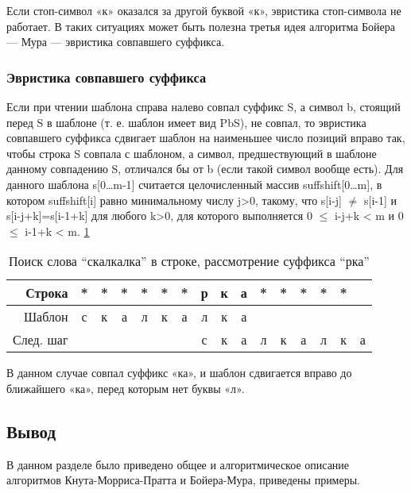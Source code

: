 \documentclass[../main.tex]{subfiles}
\begin{document}
	Если стоп-символ «к» оказался за другой буквой «к», эвристика стоп-символа не работает. 
	В таких ситуациях может быть полезна третья идея алгоритма Бойера — Мура — эвристика совпавшего суффикса.

\subsubsection{Эвристика совпавшего суффикса}
	
	Если при чтении шаблона справа налево совпал суффикс S, а символ b, стоящий перед S в шаблоне (т. е. шаблон имеет вид PbS), не совпал, то эвристика совпавшего суффикса сдвигает шаблон на наименьшее число позиций вправо так, чтобы строка S совпала с шаблоном, а символ, предшествующий в шаблоне данному совпадению S, отличался бы от b (если такой символ вообще есть). 
	Для данного шаблона s[0…m-1] считается целочисленный массив suffshift[0…m], в котором suffshift[i] равно минимальному числу j>0, такому, что s[i-j] $\neq$ s[i-1] и s[i-j+k]=s[i-1+k] для любого k>0, для которого выполняется 0 $\leq$ i-j+k < m и 0 $\leq$ i-1+k < m. \ref{tab:analit:3}
	
	\begin{table}[H]
		\caption{Поиск слова “скалкалка” в строке, рассмотрение суффикса “рка”}
		\label{tab:analit:3}
		\begin{tabular}{|r|c|c|c|c|c|c|c|c|c|c|c|c|c|c|c|}
			\hline
			Строка &          * &          * &          * &          * &          * &          * &          р &          к &          а &          * &          * &          * &          * &          * &            \\
			\hline
			Шаблон &          с &          к &          а &          л &          к &          а &          л &          к &          а &            &            &            &            &            &            \\
			\hline
			След. шаг &            &            &            &            &            &            &          с &          к &          а &          л &          к &          а &          л &          к &          а \\
			\hline
		\end{tabular}  
	\end{table}

	В данном случае совпал суффикс «ка», и шаблон сдвигается вправо до ближайшего «ка», перед которым нет буквы «л».
	
\subsection{Вывод}
	 
	 В данном разделе было приведено общее и алгоритмическое описание алгоритмов Кнута-Морриса-Пратта и Бойера-Мура, приведены примеры.
	
\end{document}
